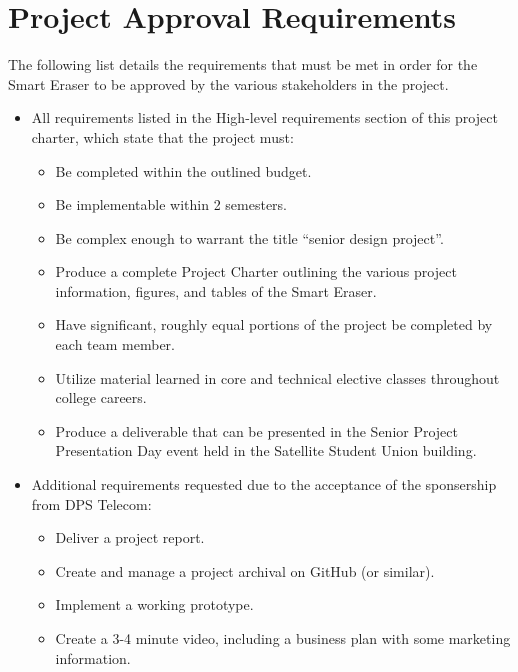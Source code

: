  \section{Project Approval Requirements}
 The following list details the requirements that must be met in order for the Smart Eraser to be approved by the various stakeholders in the project.
 \begin{itemize}
 	\item All requirements listed in the High-level requirements section of this project charter, which state that the project must:
	\begin{itemize}
		\item Be completed within the outlined budget.
		\item Be implementable within 2 semesters.
		\item Be complex enough to warrant the title ``senior design project''.
		\item Produce a complete Project Charter outlining the various project information, figures, and tables of the Smart Eraser.
		\item Have significant, roughly equal portions of the project be completed by each team member.
		\item Utilize material learned in core and technical elective classes throughout college careers.
		\item Produce a deliverable that can be presented in the Senior Project Presentation Day event held in the Satellite Student Union building.
	\end{itemize}
 	\item Additional requirements requested due to the acceptance of the sponsership from DPS Telecom:
 		\begin{itemize}
 			\item Deliver a project report.
 			\item Create and manage a project archival on GitHub (or similar).
 			\item Implement a working prototype.
 			\item Create a 3-4 minute video, including a business plan with some marketing information.
 		\end{itemize}
 \end{itemize}

\newpage

